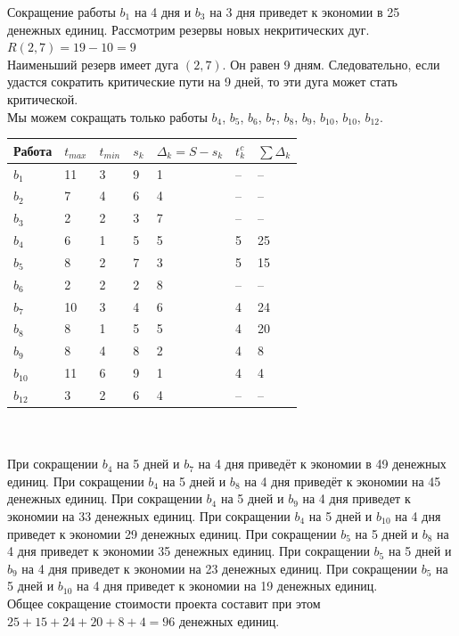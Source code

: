 \documentclass[a4paper, 12pt]{report}
\begin{document}
	Сокращение работы $b_{1}$ на 4 дня и $b_3$ на 3 дня приведет к экономии в 25 денежных единиц.
	Рассмотрим резервы новых некритических дуг.\\
	$R(2,7)=19-10=9$\\
	Наименьший резерв имеет дуга $(2,7)$. Он равен 9 дням. Следовательно, если удастся сократить критические пути на 9 дней, то эти дуга может стать критической.\\
	Мы можем сокращать только работы $b_4$, $b_5$, $b_6$, $b_7$, $b_8$, $b_9$, $b_10$, $b_{10}$, $b_{12}$.\\
	\begin{tabular}{ |p{2cm}||p{1cm}||p{1cm}||p{1cm}||p{3cm}||p{2cm}||p{2cm}|}
		\hline
		Работа & $t_{max}$ & $t_{min}$ & $s_k$ & $\Delta_k=S-s_k$ & $t_k^c$& $\sum \Delta_k$\\
		\hline
		$b_1$ & 11 & 3 & 9 & 1 & -- & --\\
		$b_2$&7&4&6&4&--&--\\
		$b_3$ & 2 & 2 & 3 & 7 & -- & --\\
		$b_4$&6&1&5&5&5&25\\
		$b_5$&8&2&7&3&5&15\\
		$b_6$ & 2 & 2 & 2 & 8 & -- & --\\
		$b_7$&10&3&4&6& 4 & 24\\
		$b_8$ & 8 & 1 & 5 & 5 & 4 & 20\\
		$b_{9}$ & 8 & 4 & 8 & 2 & 4 & 8 \\
		$b_{10}$&11&6&9&1& 4&4\\
		$b_{12}$ & 3 & 2 & 6 & 4 & -- & --\\
		\hline
	\end{tabular}\\\\
	При сокращении $b_4$ на 5 дней и $b_7$ на 4 дня приведёт к экономии в 49 денежных единиц. При сокращении $b_4$ на 5 дней и $b_8$ на 4  дня приведёт к экономии на 45 денежных единиц. При сокращении $b_4$ на 5 дней и $b_9$ на 4 дня приведет к экономии на 33 денежных единиц. При сокращении $b_4$ на 5 дней и $b_{10}$ на 4 дня приведет к экономии 29 денежных единиц. При сокращении $b_5$ на 5 дней и $b_8$ на 4 дня приведет к экономии 35 денежных единиц. При сокращении $b_5$ на 5 дней и $b_9$ на 4 дня приведет к экономии на 23 денежных единиц. При сокращении $b_5$ на 5 дней и $b_{10}$ на 4 дня приведет к экономии на 19 денежных единиц.\\
	Общее сокращение стоимости проекта составит при этом $25+15+24+20+8+4=96$  денежных единиц.\\
	
\end{document}

